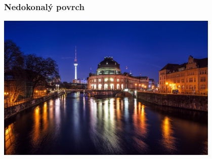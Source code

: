 \begin{frame}
    \frametitle{Nedokonalý povrch}
    \includegraphics[width=0.8\textwidth]{pics/physicallyBasedRendering/night-reflect}
\end{frame}

